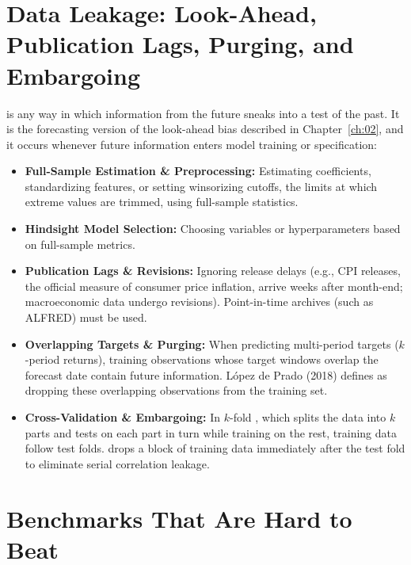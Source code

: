 \section{Data Leakage: Look-Ahead, Publication Lags, Purging, and Embargoing}
\label{sec:09-leakage}

 is any way in which information from the future sneaks into a test of the past. It is the forecasting version of the look-ahead bias described in Chapter~\ref{ch:02}, and it occurs whenever future information enters model training or specification:
\begin{itemize}
  \item \textbf{Full-Sample Estimation \& Preprocessing:} Estimating coefficients, standardizing features, or setting winsorizing cutoffs, the limits at which extreme values are trimmed, using full-sample statistics.
  \item \textbf{Hindsight Model Selection:} Choosing variables or hyperparameters based on full-sample metrics.
  \item \textbf{Publication Lags \& Revisions:} Ignoring release delays (e.g., CPI releases, the official measure of consumer price inflation, arrive weeks after month-end; macroeconomic data undergo revisions). Point-in-time archives (such as ALFRED) must be used.
  \item \textbf{Overlapping Targets \& Purging:} When predicting multi-period targets ($k$-period returns), training observations whose target windows overlap the forecast date contain future information. López de Prado (2018) defines  as dropping these overlapping observations from the training set.
  \item \textbf{Cross-Validation \& Embargoing:} In $k$-fold , which splits the data into $k$ parts and tests on each part in turn while training on the rest, training data follow test folds.  drops a block of training data immediately after the test fold to eliminate serial correlation leakage.
\end{itemize}

\section{Benchmarks That Are Hard to Beat}
\label{sec:09-benchmarks}

